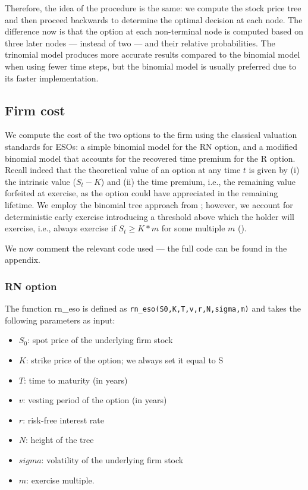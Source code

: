 Therefore, the idea of the procedure is the same: we compute the stock price tree and then proceed backwards to determine the optimal decision at each node. The difference now is that the option at each non-terminal node is computed based on three later nodes --- instead of two --- and their relative probabilities.
The trinomial model produces more accurate results compared to the binomial model when using fewer time steps, but the binomial model is usually preferred due to its faster implementation.

\subsection{Firm cost} 

We compute the cost of the two options to the firm using the classical valuation standards for ESOs: a simple binomial model for the RN option, and a modified binomial model that accounts for the recovered time premium for the R option.
Recall indeed that the theoretical value of an option at any time $t$ is given by (i) the intrinsic value ($S_t - K$) and (ii) the time premium, i.e., the remaining value forfeited at exercise, as the option could have appreciated in the remaining lifetime. 
We employ the binomial tree approach from \cite{cox1979option}; however, we account for deterministic early exercise introducing a threshold above which the holder will exercise, i.e., always exercise if $S_t \ge K*m$ for some multiple $m$ (\cite{hull2004value}).

We now comment the relevant code used --- the full code can be found in the appendix.

\subsubsection{RN option}
The function rn\_eso is defined as \verb|rn_eso(S0,K,T,v,r,N,sigma,m)| and takes the following parameters as input:
\begin{itemize}
    \item $S_0$: spot price of the underlying firm stock
    \item $K$: strike price of the option; we always set it equal to S %
    \item $T$: time to maturity (in years)
    \item $v$: vesting period of the option (in years)
    \item $r$: risk-free interest rate
    \item $N$: height of the tree
    \item $sigma$: volatility of the underlying firm stock
    \item $m$: exercise multiple.
\end{itemize}


